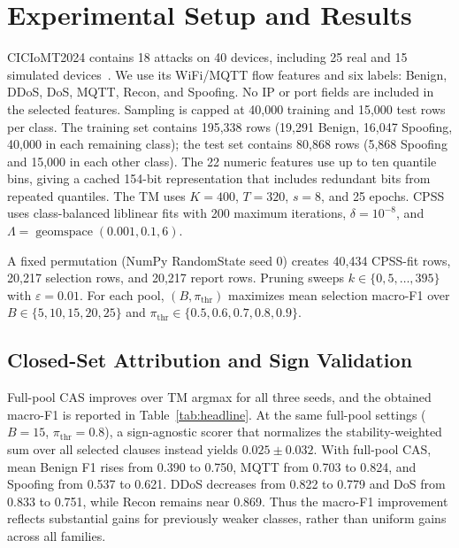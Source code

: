 \documentclass[conference]{IEEEtran}
\begin{document}
\section{Experimental Setup and Results}
\label{sec:setup}
CICIoMT2024 contains 18 attacks on 40 devices, including 25 real
and 15 simulated devices~\cite{dadkhah2024}. We use its WiFi/MQTT
flow features and six labels: Benign, DDoS, DoS, MQTT, Recon, and
Spoofing. No IP or port fields are included in the selected features.
Sampling is capped at 40,000 training and 15,000 test rows per class.
The training set contains 195,338 rows (19,291 Benign, 16,047
Spoofing, 40,000 in each remaining class); the test set contains
80,868 rows (5,868 Spoofing and 15,000 in each other class).
The 22 numeric features use up to ten quantile bins, giving a cached
154-bit representation that includes redundant bits from repeated
quantiles. The TM uses $K=400$, $T=320$, $s=8$, and 25 epochs.
CPSS uses class-balanced liblinear fits with 200 maximum iterations,
$\delta=10^{-8}$, and $\Lambda=\operatorname{geomspace}(0.001,0.1,6)$.

A fixed permutation (NumPy RandomState seed 0) creates 40,434
CPSS-fit rows, 20,217 selection rows, and 20,217 report rows.
Pruning sweeps $k\in\{0,5,\ldots,395\}$ with $\varepsilon=0.01$.
For each pool, $(B,\pi_{\mathrm{thr}})$ maximizes mean selection
macro-F1 over $B\in\{5,10,15,20,25\}$ and
$\pi_{\mathrm{thr}}\in\{0.5,0.6,0.7,0.8,0.9\}$.


\subsection{Closed-Set Attribution and Sign Validation}
\label{sec:taska}\label{sec:validation}
Full-pool CAS improves over TM argmax for all
three seeds, and the obtained macro-F1 is reported in Table~\ref{tab:headline}. At the same full-pool settings ($B=15$, $\pi_{\mathrm{thr}}=0.8$),
a sign-agnostic scorer that normalizes the stability-weighted sum
over all selected clauses instead yields $0.025\pm0.032$. With full-pool CAS,
mean Benign F1 rises from 0.390 to 0.750, MQTT from 0.703 to 0.824,
and Spoofing from 0.537 to 0.621. DDoS decreases from 0.822 to 0.779
and DoS from 0.833 to 0.751, while Recon remains near 0.869. Thus the macro-F1 improvement reflects substantial
gains for previously weaker classes, rather than uniform gains across
all families.
\end{document}
